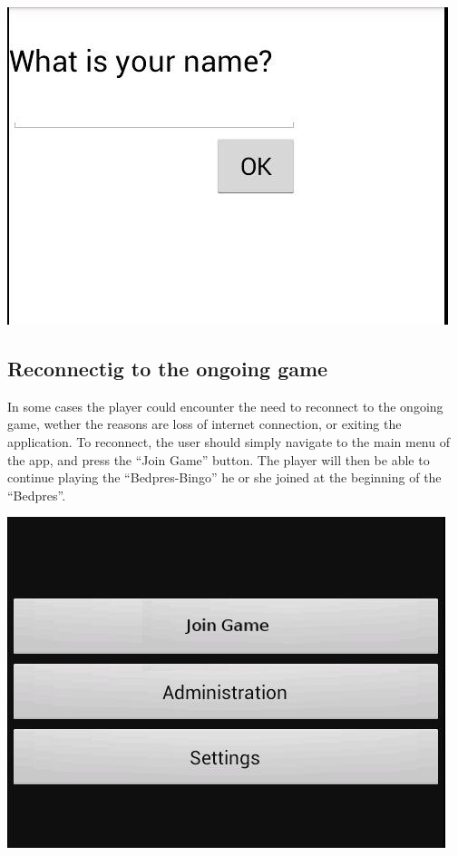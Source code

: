 \begin{center}
\includegraphics[scale=0.6]{Pikks/settings}
\end{center}

\subsection{Reconnectig to the ongoing game}
In some cases the player could encounter the need to reconnect to the
ongoing game, wether the reasons are loss of internet connection,
or exiting the application. To reconnect, the user should simply
navigate to the main menu of the app, and press the ``Join Game''
button. The player will then be able to continue playing the 
``Bedpres-Bingo'' he or she joined at the beginning of the ``Bedpres''.

\begin{center}
\includegraphics[scale=0.6]{Pikks/mainmenu-join}
\end{center}

